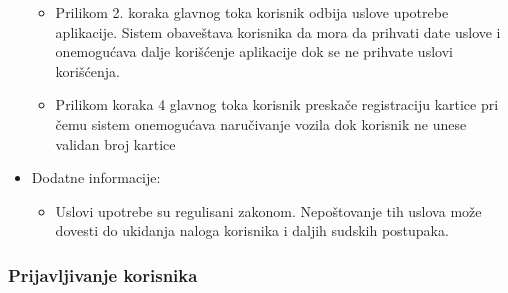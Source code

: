 \begin{itemize}
        \begin{itemize}
            \item Prilikom 2. koraka glavnog toka korisnik odbija uslove upotrebe aplikacije. Sistem obaveštava korisnika da mora da prihvati date uslove i onemogućava dalje korišćenje aplikacije dok se ne prihvate uslovi korišćenja.
            \item Prilikom koraka 4 glavnog toka korisnik preskače registraciju kartice pri čemu sistem onemogućava naručivanje vozila dok korisnik ne unese validan broj kartice
        \end{itemize}
    \item Dodatne informacije:
        \begin{itemize}
            \item Uslovi upotrebe su regulisani zakonom. Nepoštovanje tih uslova može dovesti do ukidanja naloga korisnika i daljih sudskih postupaka.
        \end{itemize}
\end{itemize}

\subsubsection{\bfseries Prijavljivanje korisnika}

